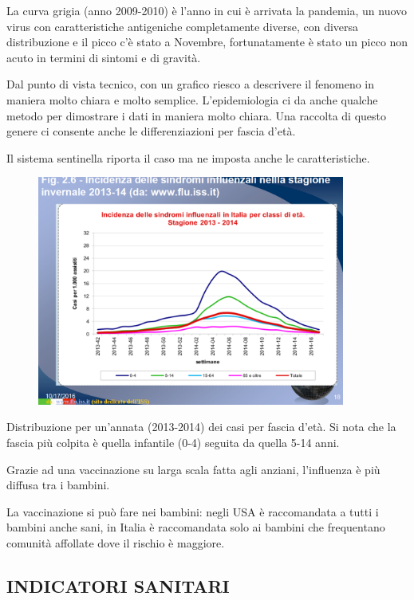La curva grigia (anno 2009-2010) è l'anno in cui è arrivata la pandemia,
un nuovo virus con caratteristiche antigeniche completamente diverse,
con diversa distribuzione e il picco c'è stato a Novembre,
fortunatamente è stato un picco non acuto in termini di sintomi e di
gravità.

Dal punto di vista tecnico, con un grafico riesco a descrivere il
fenomeno in maniera molto chiara e molto semplice. L'epidemiologia ci da
anche qualche metodo per dimostrare i dati in maniera molto chiara. Una
raccolta di questo genere ci consente anche le differenziazioni per
fascia d'età.

Il sistema sentinella riporta il caso ma ne imposta anche le
caratteristiche.
\begin{figure}[!ht]
\centering
	\includegraphics[width=0.9\textwidth]{02/image4.png}
\end{figure}


Distribuzione per un'annata (2013-2014) dei casi per fascia d'età. Si
nota che la fascia più colpita è quella infantile (0-4) seguita da
quella 5-14 anni.

Grazie ad una vaccinazione su larga scala fatta agli anziani,
l'influenza è più diffusa tra i bambini.

La vaccinazione si può fare nei bambini: negli USA è raccomandata a
tutti i bambini anche sani, in Italia è raccomandata solo ai bambini che
frequentano comunità affollate dove il rischio è maggiore.

\subsection{INDICATORI SANITARI}


